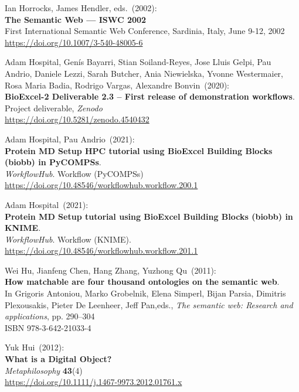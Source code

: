 \begin{thebibliography}{9}
Ian Horrocks, James Hendler, eds.~(2002): \\
\textbf{The {Semantic Web} --- {ISWC} 2002} \\
First International Semantic Web Conference, Sardinia, Italy, June 9-12, 2002\\
\url{https://doi.org/10.1007/3-540-48005-6}

Adam Hospital, Genís Bayarri, Stian Soiland-Reyes, Jose Lluis Gelpi, Pau Andrio, Daniele Lezzi, Sarah Butcher, Ania Niewielska, Yvonne Westermaier, Rosa Maria Badia, Rodrigo Vargas, Alexandre Bonvin~(2020): \\
\textbf{BioExcel-2 Deliverable 2.3 -- First release of demonstration workflows}.\\
Project deliverable, \emph{Zenodo}\\
\url{https://doi.org/10.5281/zenodo.4540432}

Adam Hospital, Pau Andrio~(2021): \\
\textbf{Protein MD Setup HPC tutorial using BioExcel Building Blocks (biobb) in PyCOMPSs}.\\
\emph{WorkflowHub}. Workflow (PyCOMPSs)\\
\url{https://doi.org/10.48546/workflowhub.workflow.200.1}

Adam Hospital~(2021): \\
\textbf{Protein MD Setup tutorial using BioExcel Building Blocks (biobb) in KNIME}.\\
\emph{WorkflowHub}. Workflow (KNIME).\\
\url{https://doi.org/10.48546/workflowhub.workflow.201.1}

Wei Hu, Jianfeng Chen, Hang Zhang, Yuzhong Qu~(2011): \\
\textbf{How matchable are four thousand ontologies on the semantic web}. \\
In Grigoris
Antoniou, Marko Grobelnik, Elena Simperl, Bijan Parsia, Dimitris
Plexousakis, Pieter De Leenheer, Jeff Pan,eds., \emph{The semantic web: {Research} and applications}, pp. 290--304 \\
ISBN 978-3-642-21033-4

Yuk Hui~(2012): \\
\textbf{What is a Digital Object?}\\
\emph{Metaphilosophy} \textbf{43}(4)\\
\url{https://doi.org/10.1111/j.1467-9973.2012.01761.x}


\end{thebibliography}
